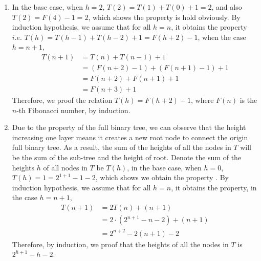 \documentclass[a4paper,12pt]{article}
\begin{document}
\begin{enumerate}
\item{
In the base case, when $h=2$, $T(2) = T(1) + T(0) + 1 = 2$, and also $T(2) = F(4)-1 = 2$, which shows the property is hold obviously. By induction hypothesis, we assume that for all $h=n$, it obtains the property $i.e.$ $T(h)=T(h-1)+T(h-2)+1=F(h+2)-1$, when the case $h = n+1$,
\[
\begin{split}
    T(n+1) & = T(n) + T(n-1) + 1 \\
    & = (F(n+2) - 1) + (F(n+1) - 1) + 1 \\
    & = F(n+2) + F(n+1) + 1 \\
    & = F(n+3) + 1
\end{split}
\]
Therefore, we proof the relation $T(h) = F(h+2) -1$, where $F(n)$ is the $n$-th Fibonacci number, by induction.
}

\item{
Due to the property of the full binary tree, we can observe that the height increasing one layer means it creates a new root node to connect the origin full binary tree. As a result, the sum of the heights of all the nodes in $T$ will be the sum of the sub-tree and the height of root. Denote the sum of the heights $h$ of all nodes in $T$ be $T(h)$, in the base case, when $h=0$, $T(h) = 1 = 2^{1+1} - 1 - 2$, which shows we obtain the property . By induction hypothesis, we assume that for all $h=n$, it obtains the property, in the case $h = n +1$,
\[
\begin{split}
    T(n+1) & = 2T(n) + (n+1) \\
    & = 2\cdot (2^{n+1} -n -2) + (n + 1) \\
    & = 2^{n+2} - 2(n+1) - 2
\end{split}
\]
Therefore, by induction, we proof that the heights of all the nodes in $T$ is $2^{h+1}-h-2$.
}


\end{enumerate}
\end{document}
